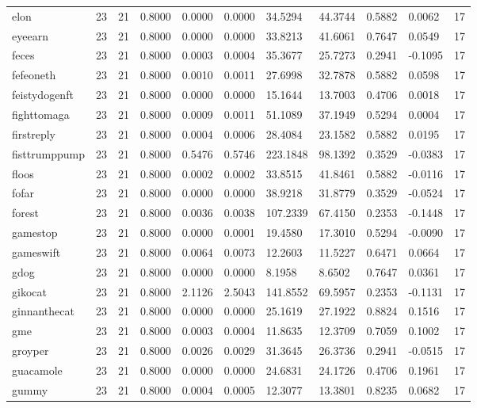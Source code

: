 \begin{table}[htbp]
\begin{tabular}{lllllllllll}
elon & 23 & 21 & 0.8000 & 0.0000 & 0.0000 & 34.5294 & 44.3744 & 0.5882 & 0.0062 & 17 \\
eyeearn & 23 & 21 & 0.8000 & 0.0000 & 0.0000 & 33.8213 & 41.6061 & 0.7647 & 0.0549 & 17 \\
feces & 23 & 21 & 0.8000 & 0.0003 & 0.0004 & 35.3677 & 25.7273 & 0.2941 & -0.1095 & 17 \\
fefeoneth & 23 & 21 & 0.8000 & 0.0010 & 0.0011 & 27.6998 & 32.7878 & 0.5882 & 0.0598 & 17 \\
feistydogenft & 23 & 21 & 0.8000 & 0.0000 & 0.0000 & 15.1644 & 13.7003 & 0.4706 & 0.0018 & 17 \\
fighttomaga & 23 & 21 & 0.8000 & 0.0009 & 0.0011 & 51.1089 & 37.1949 & 0.5294 & 0.0004 & 17 \\
firstreply & 23 & 21 & 0.8000 & 0.0004 & 0.0006 & 28.4084 & 23.1582 & 0.5882 & 0.0195 & 17 \\
fisttrumppump & 23 & 21 & 0.8000 & 0.5476 & 0.5746 & 223.1848 & 98.1392 & 0.3529 & -0.0383 & 17 \\
floos & 23 & 21 & 0.8000 & 0.0002 & 0.0002 & 33.8515 & 41.8461 & 0.5882 & -0.0116 & 17 \\
fofar & 23 & 21 & 0.8000 & 0.0000 & 0.0000 & 38.9218 & 31.8779 & 0.3529 & -0.0524 & 17 \\
forest & 23 & 21 & 0.8000 & 0.0036 & 0.0038 & 107.2339 & 67.4150 & 0.2353 & -0.1448 & 17 \\
gamestop & 23 & 21 & 0.8000 & 0.0000 & 0.0001 & 19.4580 & 17.3010 & 0.5294 & -0.0090 & 17 \\
gameswift & 23 & 21 & 0.8000 & 0.0064 & 0.0073 & 12.2603 & 11.5227 & 0.6471 & 0.0664 & 17 \\
gdog & 23 & 21 & 0.8000 & 0.0000 & 0.0000 & 8.1958 & 8.6502 & 0.7647 & 0.0361 & 17 \\
gikocat & 23 & 21 & 0.8000 & 2.1126 & 2.5043 & 141.8552 & 69.5957 & 0.2353 & -0.1131 & 17 \\
ginnanthecat & 23 & 21 & 0.8000 & 0.0000 & 0.0000 & 25.1619 & 27.1922 & 0.8824 & 0.1516 & 17 \\
gme & 23 & 21 & 0.8000 & 0.0003 & 0.0004 & 11.8635 & 12.3709 & 0.7059 & 0.1002 & 17 \\
groyper & 23 & 21 & 0.8000 & 0.0026 & 0.0029 & 31.3645 & 26.3736 & 0.2941 & -0.0515 & 17 \\
guacamole & 23 & 21 & 0.8000 & 0.0000 & 0.0000 & 24.6831 & 24.1726 & 0.4706 & 0.1961 & 17 \\
gummy & 23 & 21 & 0.8000 & 0.0004 & 0.0005 & 12.3077 & 13.3801 & 0.8235 & 0.0682 & 17 \\

\end{tabular}
\end{table}

